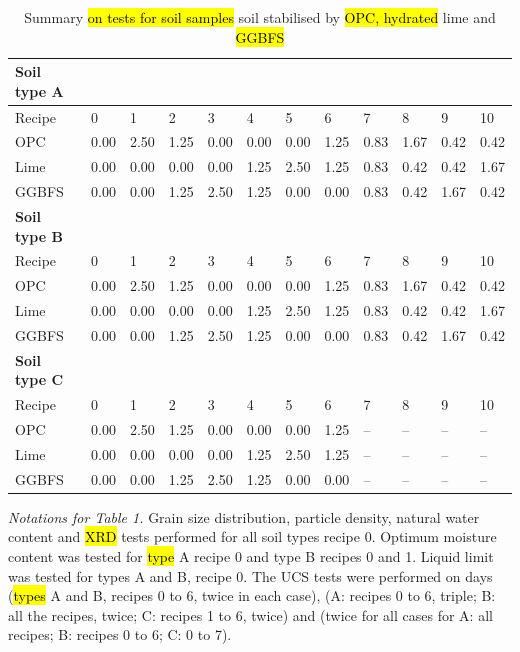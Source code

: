 \documentclass[electronics,article,submit,pdftex,moreauthors]{Definitions/mdpi}
\begin{document}
\begin{table}[H]
\begin{threeparttable}
\caption{Summary \hl{on tests for soil samples} soil stabilised by \hl{OPC, hydrated} lime and \hl{GGBFS}}
\small
    \begin{tabularx}{\textwidth}{|l|l|l|l|l|l|l|l|l|l|l|l|}
    \toprule
        \textbf{Soil type A} & ~ & ~ & ~ & ~ & ~ & ~ & ~ & ~ & ~ & ~ & ~ \\
        \midrule
        Recipe & 0 & 1 & 2 & 3 & 4 & 5 & 6 & 7 & 8 & 9 & 10 \\ 
        \midrule
        OPC & 0.00 & 2.50 & 1.25 & 0.00 & 0.00 & 0.00 & 1.25 & 0.83 & 1.67 & 0.42 & 0.42 \\ \hline
        Lime & 0.00 & 0.00 & 0.00 & 0.00 & 1.25 & 2.50 & 1.25 & 0.83 & 0.42 & 0.42 & 1.67 \\ \hline
        GGBFS & 0.00 & 0.00 & 1.25 & 2.50 & 1.25 & 0.00 & 0.00 & 0.83 & 0.42 & 1.67 & 0.42 \\ \hline
        \textbf{Soil type B} & ~ & ~ & ~ & ~ & ~ & ~ & ~ & ~ & ~ & ~ & ~ \\ 
        \midrule
        Recipe & 0 & 1 & 2 & 3 & 4 & 5 & 6 & 7 & 8 & 9 & 10 \\ \hline
        OPC & 0.00 & 2.50 & 1.25 & 0.00 & 0.00 & 0.00 & 1.25 & 0.83 & 1.67 & 0.42 & 0.42 \\ \hline
        Lime & 0.00 & 0.00 & 0.00 & 0.00 & 1.25 & 2.50 & 1.25 & 0.83 & 0.42 & 0.42 & 1.67 \\ \hline
        GGBFS & 0.00 & 0.00 & 1.25 & 2.50 & 1.25 & 0.00 & 0.00 & 0.83 & 0.42 & 1.67 & 0.42 \\ \hline
        \textbf{Soil type C} & ~ & ~ & ~ & ~ & ~ & ~ & ~ & ~ & ~ & ~ & ~ \\ 
        \midrule
        Recipe & 0 & 1 & 2 & 3 & 4 & 5 & 6 & 7 & 8 & 9 & 10 \\ \hline
        OPC & 0.00 & 2.50 & 1.25 & 0.00 & 0.00 & 0.00 & 1.25 & – & – & – & – \\ \hline
        Lime & 0.00 & 0.00 & 0.00 & 0.00 & 1.25 & 2.50 & 1.25 & – & – & – & – \\ \hline
        GGBFS & 0.00 & 0.00 & 1.25 & 2.50 & 1.25 & 0.00 & 0.00 & – & – & – & – \\ 
        \bottomrule
    \end{tabularx} \label{tab:1}
        \begin{tablenotes}
      \scriptsize
      	\item \emph{Notations for Table 1.} Grain size distribution, particle density, natural water content and \hl{XRD} tests\hl{ }performed for all\hl{ }soil types recipe 0. Optimum moisture content was tested for\hl{ type} A recipe 0 and type B recipes 0 and 1. Liquid limit was tested for\hl{ }types A and B, recipe 0. The UCS tests were performed on days  (\hl{types} A and B, recipes 0 to 6, twice in each case),  (A: recipes 0 to 6, triple; B: all the recipes, twice; C: recipes 1 to 6, twice) and  (twice for all cases for A: all recipes; B: recipes 0 to 6; C: 0 to 7).
    \end{tablenotes}
  \end{threeparttable}
\end{table}
\end{document}
